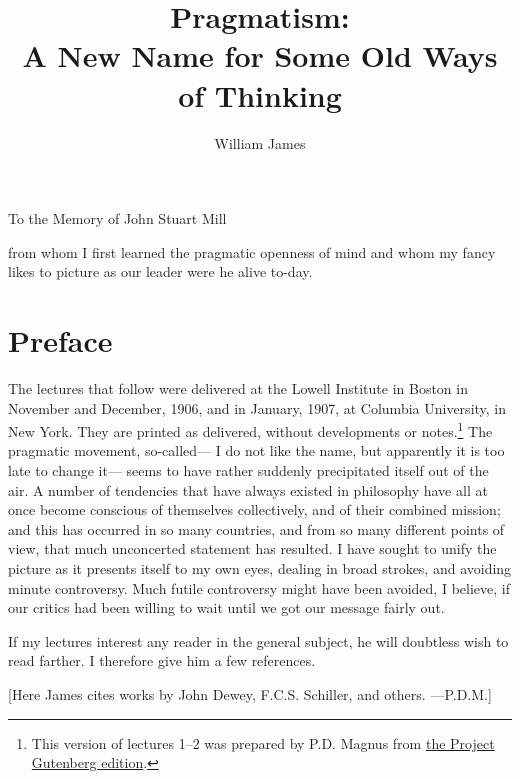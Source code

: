 \documentclass[]{article}
\begin{document}

\title{Pragmatism:\\ A New Name for Some Old Ways of Thinking}
\author{William James}
\date{}
\maketitle


\begin{center}
To the Memory of John Stuart Mill

from whom I first learned the pragmatic openness of mind and whom my
fancy likes to picture as our leader were he alive to-day.
\end{center}



\section*{Preface}

The lectures that follow were delivered at the Lowell Institute in
Boston in November and December, 1906, and in January, 1907, at
Columbia University, in New York. They are printed as delivered, without
developments or notes.\footnote{This version of lectures 1--2 was prepared by P.D. Magnus from \href{http://www.gutenberg.org/ebooks/5116}{the Project Gutenberg edition}.} The pragmatic movement, so-called--- I do not like
the name, but apparently it is too late to change it--- seems to have
rather suddenly precipitated itself out of the air. A number of
tendencies that have always existed in philosophy have all at once
become conscious of themselves collectively, and of their combined
mission; and this has occurred in so many countries, and from so many
different points of view, that much unconcerted statement has resulted.
I have sought to unify the picture as it presents itself to my own eyes,
dealing in broad strokes, and avoiding minute controversy. Much futile
controversy might have been avoided, I believe, if our critics had been
willing to wait until we got our message fairly out.

If my lectures interest any reader in the general subject, he will
doubtless wish to read farther. I therefore give him a few references.

\medskip

[Here James cites works by John Dewey, F.C.S. Schiller, and others. ---P.D.M.]
\end{document}
